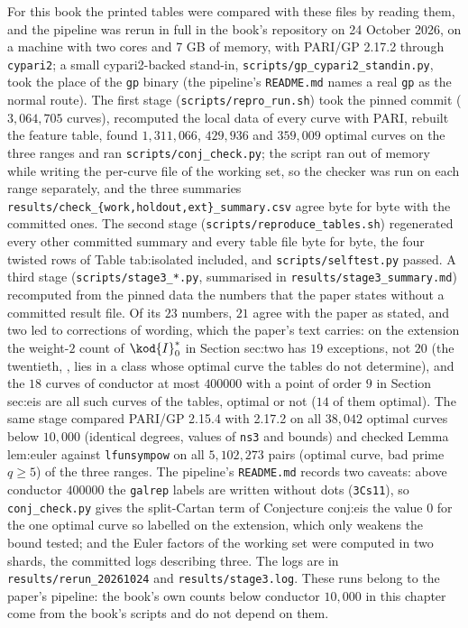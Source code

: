 \begin{sloppypar}
\begin{remark}
For this book the printed tables were compared with these files by reading them, and the pipeline was rerun in full in the book's repository on
24 October 2026, on a machine with two cores and 7 GB of memory, with PARI/GP 2.17.2 through \texttt{cypari2}; a small cypari2-backed stand-in,
\texttt{scripts/gp\_cypari2\_standin.py}, took the place of the \texttt{gp} binary (the pipeline's \texttt{README.md} names a real \texttt{gp} as the
normal route). The first stage (\texttt{scripts/repro\_run.sh}) took the pinned commit ($3{,}064{,}705$ curves), recomputed the local data of every curve
with PARI, rebuilt the feature table, found $1{,}311{,}066$, $429{,}936$ and $359{,}009$ optimal curves on the three ranges and ran
\texttt{scripts/conj\_check.py}; the script ran out of memory while writing the per-curve file of the working set, so the checker was run on each range
separately, and the three summaries \texttt{results/check\_\{work,holdout,ext\}\_summary.csv} agree byte for byte with the committed ones. The second stage
(\texttt{scripts/reproduce\_tables.sh}) regenerated every other committed summary and every table file byte for byte, the four twisted rows of Table
tab:isolated included, and \texttt{scripts/selftest.py} passed. A third stage (\texttt{scripts/stage3\_*.py}, summarised in
\texttt{results/stage3\_summary.md}) recomputed from the pinned data the numbers that the paper states without a committed result file. Of its $23$
numbers, $21$ agree with the paper as stated, and two led to corrections of wording, which the paper's text carries: on the extension the weight-$2$ count of
$\kod{I}_0^*$ in Section sec:two has $19$ exceptions, not $20$ (the twentieth, , lies in a class whose optimal curve the tables do not
determine), and the $18$ curves of conductor at most $400000$ with a point of order $9$ in Section sec:eis are all such curves of the tables, optimal or
not ($14$ of them optimal). The same stage compared PARI/GP 2.15.4 with 2.17.2 on all $38{,}042$ optimal curves below $10{,}000$ (identical degrees,
values of \texttt{ns3} and bounds) and checked Lemma lem:euler against \texttt{lfunsympow} on all $5{,}102{,}273$ pairs (optimal curve, bad prime $q\ge5$)
of the three ranges. The pipeline's \texttt{README.md} records two caveats: above conductor $400000$ the \texttt{galrep} labels are written without dots
(\texttt{3Cs11}), so \texttt{conj\_check.py} gives the split-Cartan term of Conjecture conj:eis the value $0$ for the one optimal curve so labelled on the
extension, which only weakens the bound tested; and the Euler factors of the working set were computed in two shards, the committed logs describing
three. The logs are in \texttt{results/rerun\_20261024} and \texttt{results/stage3.log}. These runs belong to the paper's pipeline: the book's own counts
below conductor $10{,}000$ in this chapter come from the book's scripts and do not depend on them.


\end{remark}
\end{sloppypar}
